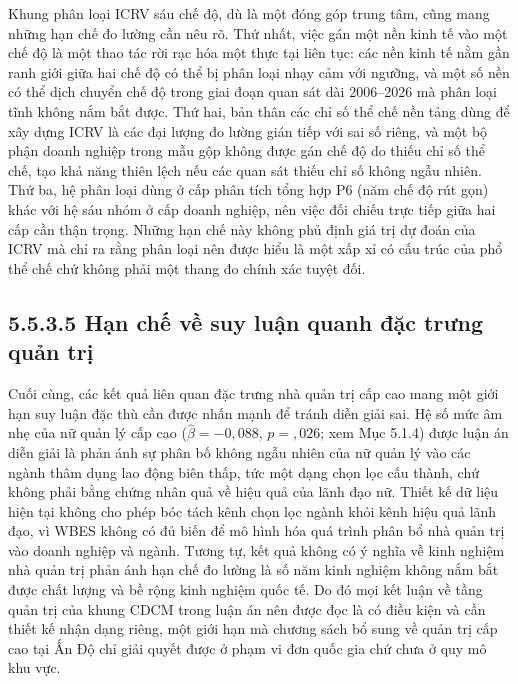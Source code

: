 \documentclass[
  a4paper,
  13pt]{extreport}
\begin{document}
Khung phân loại ICRV sáu chế độ, dù là một đóng góp trung tâm, cũng mang
những hạn chế đo lường cần nêu rõ. Thứ nhất, việc gán một nền kinh tế
vào một chế độ là một thao tác rời rạc hóa một thực tại liên tục: các
nền kinh tế nằm gần ranh giới giữa hai chế độ có thể bị phân loại nhạy
cảm với ngưỡng, và một số nền có thể dịch chuyển chế độ trong giai đoạn
quan sát dài 2006--2026 mà phân loại tĩnh không nắm bắt được. Thứ hai,
bản thân các chỉ số thể chế nền tảng dùng để xây dựng ICRV là các đại
lượng đo lường gián tiếp với sai số riêng, và một bộ phận doanh nghiệp
trong mẫu gộp không được gán chế độ do thiếu chỉ số thể chế, tạo khả
năng thiên lệch nếu các quan sát thiếu chỉ số không ngẫu nhiên. Thứ ba,
hệ phân loại dùng ở cấp phân tích tổng hợp P6 (năm chế độ rút gọn) khác
với hệ sáu nhóm ở cấp doanh nghiệp, nên việc đối chiếu trực tiếp giữa
hai cấp cần thận trọng. Những hạn chế này không phủ định giá trị dự đoán
của ICRV mà chỉ ra rằng phân loại nên được hiểu là một xấp xỉ có cấu
trúc của phổ thể chế chứ không phải một thang đo chính xác tuyệt đối.

\hypertarget{hux1ea1n-chux1ebf-vux1ec1-suy-luux1eadn-quanh-ux111ux1eb7c-trux1b0ng-quux1ea3n-trux1ecb}{%
\subsection{5.5.3.5 Hạn chế về suy luận quanh đặc trưng quản
trị}\label{hux1ea1n-chux1ebf-vux1ec1-suy-luux1eadn-quanh-ux111ux1eb7c-trux1b0ng-quux1ea3n-trux1ecb}}

Cuối cùng, các kết quả liên quan đặc trưng nhà quản trị cấp cao mang một
giới hạn suy luận đặc thù cần được nhấn mạnh để tránh diễn giải sai. Hệ
số mức âm nhẹ của nữ quản lý cấp cao (\(\hat{\beta} = -0{,}088\),
\(p = {,}026\); xem Mục 5.1.4) được luận án diễn giải là phản ánh sự
phân bố không ngẫu nhiên của nữ quản lý vào các ngành thâm dụng lao động
biên thấp, tức một dạng chọn lọc cấu thành, chứ không phải bằng chứng
nhân quả về hiệu quả của lãnh đạo nữ. Thiết kế dữ liệu hiện tại không
cho phép bóc tách kênh chọn lọc ngành khỏi kênh hiệu quả lãnh đạo, vì
WBES không có đủ biến để mô hình hóa quá trình phân bổ nhà quản trị vào
doanh nghiệp và ngành. Tương tự, kết quả không có ý nghĩa về kinh nghiệm
nhà quản trị phản ánh hạn chế đo lường là số năm kinh nghiệm không nắm
bắt được chất lượng và bề rộng kinh nghiệm quốc tế. Do đó mọi kết luận
về tầng quản trị của khung CDCM trong luận án nên được đọc là có điều
kiện và cần thiết kế nhận dạng riêng, một giới hạn mà chương sách bổ
sung về quản trị cấp cao tại Ấn Độ chỉ giải quyết được ở phạm vi đơn
quốc gia chứ chưa ở quy mô khu vực.
\end{document}
